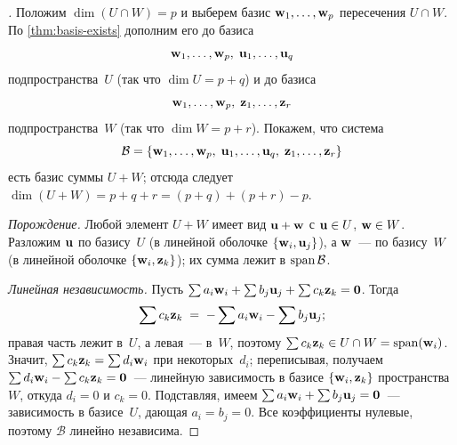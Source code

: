\begin{proof}[]
Положим $\dim(U \cap W) = p$ и выберем базис
$\mathbf{w}_1, \dots, \mathbf{w}_p$ пересечения $U \cap W$. По
\cref{thm:basis-exists} дополним его до базиса
\[
  \mathbf{w}_1, \dots, \mathbf{w}_p,\; \mathbf{u}_1, \dots, \mathbf{u}_q
\]
подпространства~$U$ (так что $\dim U = p + q$) и до базиса
\[
  \mathbf{w}_1, \dots, \mathbf{w}_p,\; \mathbf{z}_1, \dots, \mathbf{z}_r
\]
подпространства~$W$ (так что $\dim W = p + r$). Покажем, что система
\[
  \mathcal{B} = \{\mathbf{w}_1, \dots, \mathbf{w}_p,\; \mathbf{u}_1, \dots, \mathbf{u}_q,\;
                  \mathbf{z}_1, \dots, \mathbf{z}_r\}
\]
есть базис суммы $U + W$; отсюда следует
$\dim(U + W) = p + q + r = (p + q) + (p + r) - p$.

\emph{Порождение.} Любой элемент $U + W$ имеет вид $\mathbf{u} + \mathbf{w}$
с $\mathbf{u} \in U$, $\mathbf{w} \in W$. Разложим $\mathbf{u}$ по базису~$U$
(в линейной оболочке $\{\mathbf{w}_i, \mathbf{u}_j\}$), а $\mathbf{w}$~--- по
базису~$W$ (в линейной оболочке $\{\mathbf{w}_i, \mathbf{z}_k\}$); их сумма
лежит в $\operatorname{span} \mathcal{B}$.

\emph{Линейная независимость.} Пусть
$\sum a_i \mathbf{w}_i + \sum b_j \mathbf{u}_j + \sum c_k \mathbf{z}_k = \mathbf{0}$.
Тогда
\[
  \sum c_k \mathbf{z}_k \;=\; -\sum a_i \mathbf{w}_i - \sum b_j \mathbf{u}_j;
\]
правая часть лежит в~$U$, а левая~--- в~$W$, поэтому
$\sum c_k \mathbf{z}_k \in U \cap W = \operatorname{span}(\mathbf{w}_i)$. Значит,
$\sum c_k \mathbf{z}_k = \sum d_i \mathbf{w}_i$ при некоторых~$d_i$;
переписывая, получаем $\sum d_i \mathbf{w}_i - \sum c_k \mathbf{z}_k = \mathbf{0}$~---
линейную зависимость в базисе $\{\mathbf{w}_i, \mathbf{z}_k\}$
пространства~$W$, откуда $d_i = 0$ и $c_k = 0$. Подставляя, имеем
$\sum a_i \mathbf{w}_i + \sum b_j \mathbf{u}_j = \mathbf{0}$~--- зависимость
в базисе~$U$, дающая $a_i = b_j = 0$. Все коэффициенты нулевые, поэтому
$\mathcal{B}$ линейно независима.
\end{proof}

